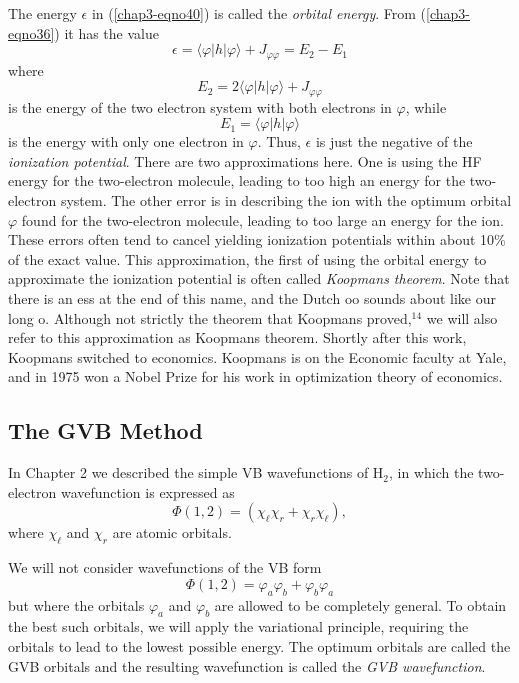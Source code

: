 The energy $\epsilon$ in (\ref{chap3-eqno40}) is called the
\emph{orbital energy}.  From (\ref{chap3-eqno36}) it has the value
\begin{equation}
\epsilon = \langle \varphi \vert h \vert \varphi \rangle + J_{\varphi \varphi} = 
E_2 - E_1
\end{equation}
where
\begin{equation}
E_2 = 2 \langle \varphi \vert h \vert \varphi \rangle + J_{\varphi \varphi}
\end{equation}
is the energy of the two electron system with both electrons in $\varphi$, while
\begin{equation}
E_1 = \langle \varphi \vert h \vert \varphi \rangle
\end{equation}
is the energy with only one electron in $\varphi$. Thus, $\epsilon$ is
just the negative of the \emph{ionization potential}.  There are two
approximations here.  One is using the HF energy for the two-electron
molecule, leading to too high an energy for the two-electron system.
The other error is in describing the ion with the optimum orbital
$\varphi$ found for the two-electron molecule, leading to too large an
energy for the ion.  These errors often tend to cancel yielding
ionization potentials within about 10\% of the exact value. This
approximation, the first \cite{chap3-ref9} of using the orbital energy
to approximate the ionization potential is often called \emph{Koopmans
theorem}.  Note that there is an ess at the end of this name, and the
Dutch oo sounds about like our long o.  Although not strictly the
theorem that Koopmans proved,$^{14}$ we will also refer to this
approximation as Koopmans theorem.  Shortly after this work, Koopmans
switched to economics.  Koopmans is on the Economic faculty at Yale,
and in 1975 won a Nobel Prize for his work in optimization theory of
economics.

\subsection{The GVB Method}

In Chapter 2 we described the simple VB wavefunctions of
H$_2$, in which the two-electron wavefunction is expressed as
\begin{equation}
\Phi (1, 2) = ( \chi_\ell \chi_r + \chi_r \chi_\ell ),
\label{chap3-eqno41}
\end{equation}
where $\chi_\ell$ and $\chi_r$ are atomic orbitals.

We will not consider wavefunctions of the VB form
\begin{equation}
\Phi (1, 2) = \varphi_a \varphi_b + \varphi_b \varphi_a
\label{chap3-eqno42}
\end{equation}
but where the orbitals $\varphi_a$ and $\varphi_b$ are allowed to be completely 
general.  To obtain the best such orbitals, we will apply the variational 
principle, requiring the orbitals to lead to the lowest possible energy.  The 
optimum orbitals are called the GVB orbitals and the 
resulting wavefunction is called the \emph{GVB wavefunction}.

